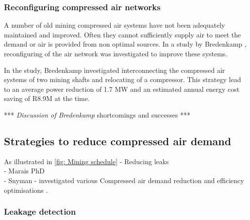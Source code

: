 		\subsubsection{Reconfiguring compressed air networks}
			A number of old mining compressed air systems  have not been adequately maintained and improved. Often they cannot sufficiently supply air to meet the demand or air is provided from non optimal sources. In a study by Bredenkamp \cite{Bredenkamp2013Masters}, reconfiguring of the air network was investigated to improve these systems.
			\par  
			In the study, Bredenkamp investigated interconnecting the compressed air systems of two mining shafts and relocating of a compressor. This strategy lead to an average power reduction of 1.7 MW and an estimated annual energy cost saving of R8.9M at the time.
			\par 
			*** \textit{Discussion of Bredenkamp} shortcomings and successes ***
			
	\subsection{Strategies to reduce compressed air demand}
	As illustrated in \cref{fig: Mining schedule}
		- Reducing leaks\\
		- Marais PhD\\
		- Snyman - investigated various Compressed air demand reduction and efficiency
		 optimisations \cite{Snyman2011Masters}.
		 
		 \subsubsection{Leakage detection}
		 
